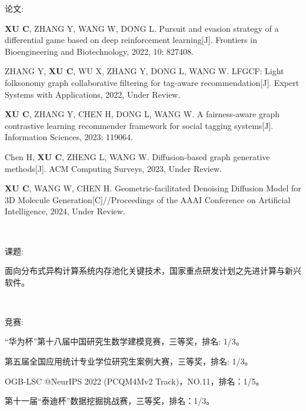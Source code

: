 \newpage
\pagestyle{fancy}
\begin{center}
\heiti{}
\end{center}


论文:

\textbf{XU C}, ZHANG Y, WANG W, DONG L. Pursuit and evasion strategy of a differential game based on deep reinforcement learning[J]. Frontiers in Bioengineering and Biotechnology, 2022, 10: 827408.

ZHANG Y, \textbf{XU C}, WU X, ZHANG Y, DONG L, WANG W. LFGCF: Light folksonomy graph collaborative filtering for tag-aware recommendation[J]. Expert Systems with Applications, 2022, Under Review.

\textbf{XU C}, ZHANG Y, CHEN H, DONG L, WANG W. A fairness-aware graph contrastive learning recommender framework for social tagging systems[J]. Information Sciences, 2023: 119064.

Chen H, \textbf{XU C}, ZHENG L, WANG W. Diffusion-based graph generative methods[J]. ACM Computing Surveys, 2023, Under Review.

\textbf{XU C}, WANG W, CHEN H. Geometric-facilitated Denoising Diffusion Model for 3D Molecule Generation[C]//Proceedings of the AAAI Conference on Artificial Intelligence, 2024, Under Review.

\

课题:

面向分布式异构计算系统内存池化关键技术，国家重点研发计划之先进计算与新兴软件。


\

竞赛:

“华为杯”第十八届中国研究生数学建模竞赛，三等奖，排名: 1/3。

第五届全国应用统计专业学位研究生案例大赛，三等奖，排名: 1/3。

OGB-LSC @NeurIPS 2022 (PCQM4Mv2 Track)，NO.11，排名：1/5。

第十一届“泰迪杯”数据挖掘挑战赛，三等奖，排名：1/3。